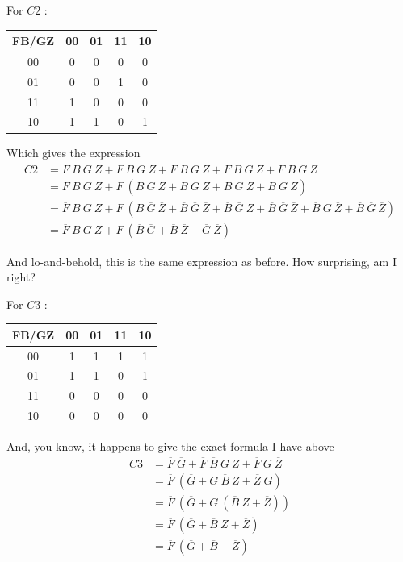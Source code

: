 \documentclass[a4paper,10pt]{article}
\begin{document}
For $C2$ :
\begin{center}
	\begin{tabular}{|c|c|c|c|c|}
		\hline
		FB/GZ&00&01&11&10\\\hline
		00&0&0&0&0\\\hline
		01&0&0&1&0\\\hline
		11&1&0&0&0\\\hline
		10&1&1&0&1\\\hline
	\end{tabular}
\end{center}
Which gives the expression
\begin{align*}
	C2&=\overline{F}~B~G~Z+F~B~\overline{G}~\overline{Z}+F~\overline{B}~\overline{G}~\overline{Z}+F~\overline{B}~\overline{G}~Z+F~\overline{B}~G~\overline{Z}\\
	  &=\overline{F}~B~G~Z+F~\left(B~\overline{G}~\overline{Z}+\overline{B}~\overline{G}~\overline{Z}+\overline{B}~\overline{G}~Z+\overline{B}~G~\overline{Z}\right)\\
	  &=\overline{F}~B~G~Z+F~\left(B~\overline{G}~\overline{Z}+\overline{B}~\overline{G}~\overline{Z}+\overline{B}~\overline{G}~Z+\overline{B}~\overline{G}~\overline{Z}+\overline{B}~G~\overline{Z}+\overline{B}~\overline{G}~\overline{Z}\right)\\
	  &=\overline{F}~B~G~Z+F~\left(\overline{B}~\overline{G}+\overline{B}~\overline{Z}+\overline{G}~\overline{Z}\right)
\end{align*}

And lo-and-behold, this is the same expression as before. How surprising, am I right?

For $C3$ :
\begin{center}
	\begin{tabular}{|c|c|c|c|c|}
		\hline
		FB/GZ&00&01&11&10\\\hline
		00&1&1&1&1\\\hline
		01&1&1&0&1\\\hline
		11&0&0&0&0\\\hline
		10&0&0&0&0\\\hline
	\end{tabular}
\end{center}

And, you know, it happens to give the exact formula I have above
\begin{align*}
	C3&=\overline{F}~\overline{G}+\overline{F}~\overline{B}~G~Z+\overline{F}~G~\overline{Z}\\
	  &=\overline{F}~\left(\overline{G}+G~\overline{B}~Z+\overline{Z}~G\right)\\
	  &=\overline{F}~\left(\overline{G}+G~\left(\overline{B}~Z+\overline{Z}\right)\right)\\
	  &=\overline{F}~\left(\overline{G}+\overline{B}~Z+\overline{Z}\right)\\
	  &=\overline{F}~\left(\overline{G}+\overline{B}+\overline{Z}\right)
\end{align*}
\end{document}
